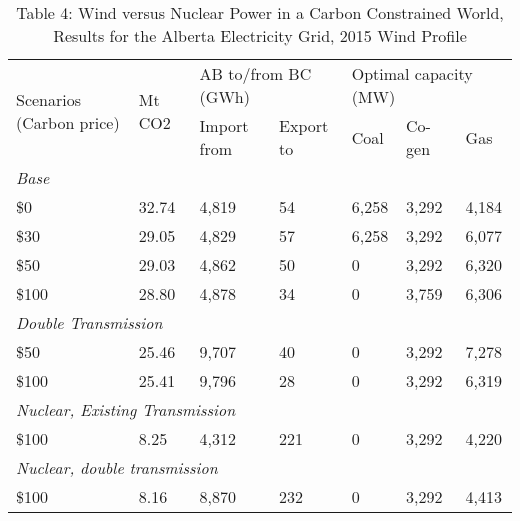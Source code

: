 \begin{table}[]
\centering
\caption{Table 4: Wind versus Nuclear Power in a Carbon Constrained World, Results for the Alberta Electricity Grid, 2015 Wind Profile}
\label{my-label4}

\begin{tabular}{@{}lllllll@{}}
\toprule
\multirow{2}{*}{Scenarios (Carbon price)} & \multirow{2}{*}{Mt CO2} & \multicolumn{2}{l}{AB to/from BC (GWh)} & \multicolumn{3}{l}{Optimal capacity (MW)} \\ \cmidrule(l){3-7} 
                                          &                         & Import from         & Export to         & Coal         & Co-gen       & Gas         \\ \midrule
\multicolumn{7}{l}{\textit{Base}}                                                                                                                         \\
\$0                                       & 32.74                   & 4,819               & 54                & 6,258        & 3,292        & 4,184       \\
\$30                                      & 29.05                   & 4,829               & 57                & 6,258        & 3,292        & 6,077       \\
\$50                                      & 29.03                   & 4,862               & 50                & 0            & 3,292        & 6,320       \\
\$100                                     & 28.80                   & 4,878               & 34                & 0            & 3,759        & 6,306       \\
\multicolumn{7}{l}{\textit{Double Transmission}}                                                                                                          \\
\$50                                      & 25.46                   & 9,707               & 40                & 0            & 3,292        & 7,278       \\
\$100                                     & 25.41                   & 9,796               & 28                & 0            & 3,292        & 6,319       \\
\multicolumn{7}{l}{\textit{Nuclear, Existing Transmission}}                                                                                               \\
\$100                                     & 8.25                    & 4,312               & 221               & 0            & 3,292        & 4,220       \\
\multicolumn{7}{l}{\textit{Nuclear, double transmission}}                                                                                                 \\
\$100                                     & 8.16                    & 8,870               & 232               & 0            & 3,292        & 4,413       \\ \bottomrule
\end{tabular}



\end{table}
